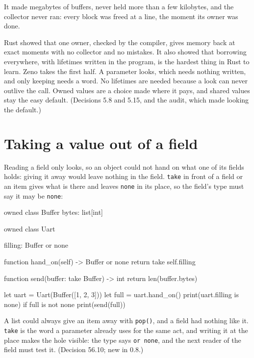 It made megabytes of buffers, never held more than a few kilobytes,
and the collector never ran: every block was freed at a line, the
moment its owner was done.

\begin{why}
Rust showed that one owner, checked by the compiler, gives memory back
at exact moments with no collector and no mistakes. It also showed that
borrowing everywhere, with lifetimes written in the program, is the
hardest thing in Rust to learn. Zeno takes the first half. A parameter
looks, which needs nothing written, and only keeping needs a word. No
lifetimes are needed because a look can never outlive the call.
Owned values are a choice made where it pays, and shared values stay
the easy default. (Decisions 5.8 and 5.15, and the audit, which made
looking the default.)
\end{why}

\section{Taking a value out of a field}

Reading a field only looks, so an object could not hand on what one of
its fields holds: giving it away would leave nothing in the field.
\verb|take| in front of a field or an item gives what is there and
leaves \verb|none| in its place, so the field's type must say it may
be \verb|none|:

\begin{zeno}
owned class Buffer {
    bytes: list[int]
}

owned class Uart {
    filling: Buffer or none

    function hand_on(self) -> Buffer or none {
        return take self.filling
    }
}

function send(buffer: take Buffer) -> int {
    return len(buffer.bytes)
}

let uart = Uart(Buffer([1, 2, 3]))
let full = uart.hand_on()
print(uart.filling is none)
if full is not none {
    print(send(full))
}
\end{zeno}

\begin{why}
A list could always give an item away with \verb|pop()|, and a field
had nothing like it. \verb|take| is the word a parameter already uses
for the same act, and writing it at the place makes the hole visible:
the type says \verb|or none|, and the next reader of the field must
test it. (Decision 56.10; new in 0.8.)
\end{why}

